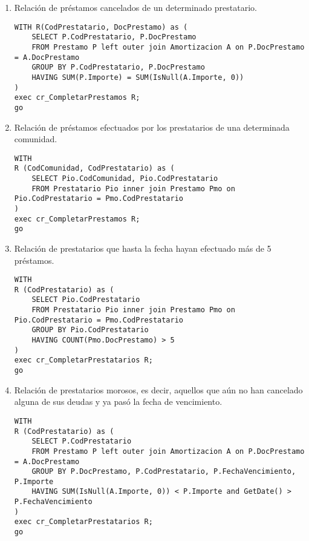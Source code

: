 \begin{enumerate}
\item Relación de préstamos cancelados de un determinado prestatario.

\begin{verbatim}
WITH R(CodPrestatario, DocPrestamo) as (
    SELECT P.CodPrestatario, P.DocPrestamo
    FROM Prestamo P left outer join Amortizacion A on P.DocPrestamo = A.DocPrestamo
    GROUP BY P.CodPrestatario, P.DocPrestamo
    HAVING SUM(P.Importe) = SUM(IsNull(A.Importe, 0))
)
exec cr_CompletarPrestamos R;
go
\end{verbatim}

\skiplines{}
\item Relación de préstamos efectuados por los prestatarios de una determinada
comunidad.

\begin{verbatim}
WITH
R (CodComunidad, CodPrestatario) as (
    SELECT Pio.CodComunidad, Pio.CodPrestatario
    FROM Prestatario Pio inner join Prestamo Pmo on Pio.CodPrestatario = Pmo.CodPrestatario
)
exec cr_CompletarPrestamos R;
go
\end{verbatim}

\skiplines{}
\item Relación de prestatarios que hasta la fecha hayan efectuado más de 5
préstamos.

\begin{verbatim}
WITH
R (CodPrestatario) as (
    SELECT Pio.CodPrestatario
    FROM Prestatario Pio inner join Prestamo Pmo on Pio.CodPrestatario = Pmo.CodPrestatario
    GROUP BY Pio.CodPrestatario
    HAVING COUNT(Pmo.DocPrestamo) > 5
)
exec cr_CompletarPrestatarios R;
go
\end{verbatim}

\skiplines{}
\item Relación de prestatarios morosos, es decir, aquellos que aún no han
cancelado alguna de sus deudas y ya pasó la fecha de vencimiento.

\begin{verbatim}
WITH
R (CodPrestatario) as (
    SELECT P.CodPrestatario
    FROM Prestamo P left outer join Amortizacion A on P.DocPrestamo = A.DocPrestamo
    GROUP BY P.DocPrestamo, P.CodPrestatario, P.FechaVencimiento, P.Importe
    HAVING SUM(IsNull(A.Importe, 0)) < P.Importe and GetDate() > P.FechaVencimiento
)
exec cr_CompletarPrestatarios R;
go
\end{verbatim}


\end{enumerate}
